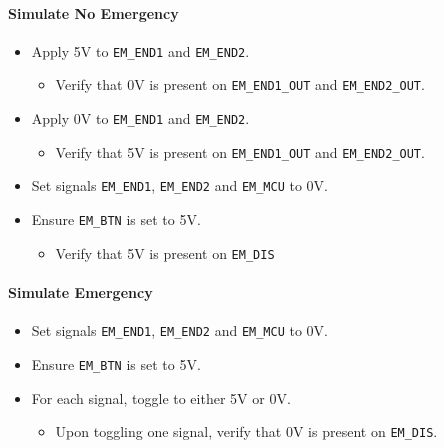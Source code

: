 \paragraph{Simulate No Emergency} %
\label{par:simulate_no_emergency}
\begin{itemize}
	\item Apply 5V to \texttt{EM\_END1} and \texttt{EM\_END2}.
	\begin{itemize}
		\item[\cmark] Verify that 0V is present on \texttt{EM\_END1\_OUT} and \texttt{EM\_END2\_OUT}.
	\end{itemize}
	\item Apply 0V to \texttt{EM\_END1} and \texttt{EM\_END2}.
	\begin{itemize}
		\item[\cmark] Verify that 5V is present on \texttt{EM\_END1\_OUT} and \texttt{EM\_END2\_OUT}.
	\end{itemize}
	\item Set signals \texttt{EM\_END1}, \texttt{EM\_END2} and \texttt{EM\_MCU} to 0V.
	\item Ensure \texttt{EM\_BTN} is set to 5V.
	\begin{itemize}
		\item[\cmark] Verify that 5V is present on \texttt{EM\_DIS}
	\end{itemize}
\end{itemize}
\paragraph{Simulate Emergency} %
\label{par:simulate_no_emergency}
\begin{itemize}
	\item Set signals \texttt{EM\_END1}, \texttt{EM\_END2} and \texttt{EM\_MCU} to 0V.
	\item Ensure \texttt{EM\_BTN} is set to 5V.
	\item For each signal, toggle to either 5V or 0V.
	\begin{itemize}
		\item[\cmark] Upon toggling one signal, verify that 0V is present on \texttt{EM\_DIS}.
	\end{itemize}
\end{itemize}
